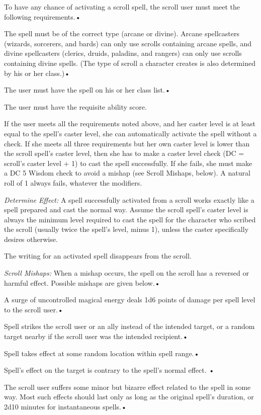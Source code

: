 To have any chance of activating a scroll spell, the scroll user must meet the 
following requirements.•

The spell must be of the correct type (arcane or divine). Arcane spellcasters (wizards, 
sorcerers, and bards) can only use scrolls containing arcane spells, and divine 
spellcasters (clerics, druids, paladins, and rangers) can only use scrolls containing 
divine spells. (The type of scroll a character creates is also determined by his 
or her class.)•

The user must have the spell on his or her class list.•

The user must have the requisite ability score.

If the user meets all the requirements noted above, and her caster level is at 
least equal to the spell's caster level, she can automatically activate the spell 
without a check. If she meets all three requirements but her own caster level is 
lower than the scroll spell's caster level, then she has to make a caster level 
check (DC = scroll's caster level + 1) to cast the spell successfully. If she fails, 
she must make a DC 5 Wisdom check to avoid a mishap (see Scroll Mishaps, below). 
A natural roll of 1 always fails, whatever the modifiers.

\textit{Determine Effect: }A spell successfully activated from a scroll works exactly 
like a spell prepared and cast the normal way. Assume the scroll spell's caster 
level is always the minimum level required to cast the spell for the character 
who scribed the scroll (usually twice the spell's level, minus 1), unless the caster 
specifically desires otherwise. 

The writing for an activated spell disappears from the scroll.

\textit{Scroll Mishaps: }When a mishap occurs, the spell on the scroll has a reversed 
or harmful effect. Possible mishaps are given below.•

A surge of uncontrolled magical energy deals 1d6 points of damage per spell level 
to the scroll user.•

Spell strikes the scroll user or an ally instead of the intended target, or a random 
target nearby if the scroll user was the intended recipient.•

Spell takes effect at some random location within spell range.•

Spell's effect on the target is contrary to the spell's normal effect. •

The scroll user suffers some minor but bizarre effect related to the spell in some 
way. Most such effects should last only as long as the original spell's duration, 
or 2d10 minutes for instantaneous spells.•

